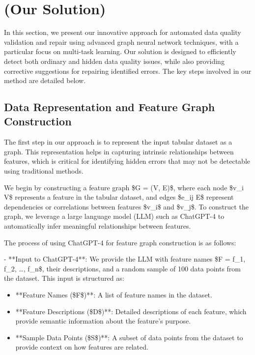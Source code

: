 
\section{(Our Solution)}

In this section, we present our innovative approach for automated data quality validation and repair using advanced graph neural network techniques, with a particular focus on multi-task learning. Our solution is designed to efficiently detect both ordinary and hidden data quality issues, while also providing corrective suggestions for repairing identified errors. The key steps involved in our method are detailed below.

\subsection{Data Representation and Feature Graph Construction}

The first step in our approach is to represent the input tabular dataset as a graph. This representation helps in capturing intrinsic relationships between features, which is critical for identifying hidden errors that may not be detectable using traditional methods.

We begin by constructing a feature graph \$G = (V, E)\$, where each node \$v\_i \in V\$ represents a feature in the tabular dataset, and edges \$e\_{ij} \in E\$ represent dependencies or correlations between features \$v\_i\$ and \$v\_j\$. To construct the graph, we leverage a large language model (LLM) such as ChatGPT-4 to automatically infer meaningful relationships between features.

\noindent The process of using ChatGPT-4 for feature graph construction is as follows:

- **Input to ChatGPT-4**: We provide the LLM with feature names \$F = {f\_1, f\_2, \dots, f\_n}\$, their descriptions, and a random sample of 100 data points from the dataset. This input is structured as:

  \begin{itemize}
  \item **Feature Names (\$F\$)**: A list of feature names in the dataset.
  \item **Feature Descriptions (\$D\$)**: Detailed descriptions of each feature, which provide semantic information about the feature's purpose.
  \item **Sample Data Points (\$S\$)**: A subset of data points from the dataset to provide context on how features are related.
  \end{itemize}

